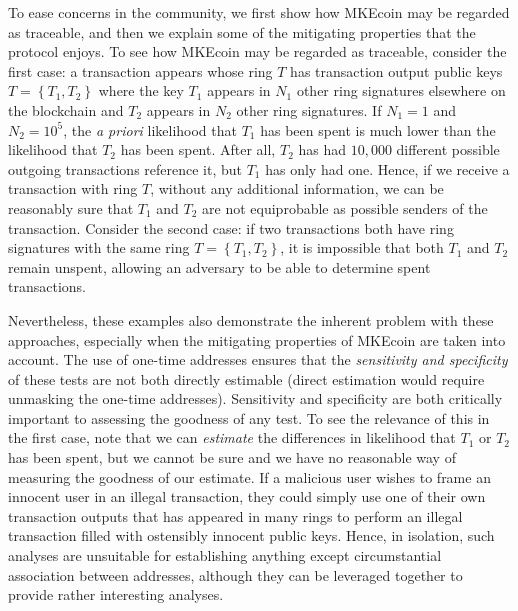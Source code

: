 \documentclass[12pt,english]{mrl}
\theoremstyle{definition}
\numberwithin{equation}{section}
\numberwithin{figure}{section}
\numberwithin{equation}{section}
\numberwithin{equation}{section}
\numberwithin{figure}{section}
\begin{document}
To ease concerns in the community, we first show how MKEcoin may be regarded as traceable, and then we explain some of the mitigating properties that the protocol enjoys. To see how MKEcoin may be regarded as traceable, consider the first case: a transaction appears whose ring $T$ has transaction output public keys $T = \left\{T_1, T_2\right\}$ where the key $T_1$ appears in $N_1$ other ring signatures elsewhere on the blockchain and $T_2$ appears in $N_2$ other ring signatures. If $N_1 = 1$ and $N_2 = 10^5$, the \textit{a priori} likelihood that $T_1$ has been spent is much lower than the likelihood that $T_2$ has been spent. After all, $T_2$ has had $10,000$ different possible outgoing transactions reference it, but $T_1$ has only had one. Hence, if we receive a transaction with ring $T$, without any additional information, we can be reasonably sure that $T_1$ and $T_2$ are not equiprobable as possible senders of the transaction. Consider the second case: if two transactions both have ring signatures with the same ring $T  = \left\{T_1, T_2\right\}$, it is impossible that both $T_1$ and $T_2$ remain unspent, allowing an adversary to be able to determine spent transactions.

Nevertheless, these examples also demonstrate the inherent problem with these approaches, especially when the mitigating properties of MKEcoin are taken into account. The use of one-time addresses ensures that the \textit{sensitivity and specificity} of these tests are not both directly estimable (direct estimation would require unmasking the one-time addresses). Sensitivity and specificity are both critically important to assessing the goodness of any test.  To see the relevance of this in the first case, note that we can \textit{estimate} the differences in likelihood that $T_1$ or $T_2$ has been spent, but we cannot be sure and we have no reasonable way of measuring the goodness of our estimate. If a malicious user wishes to frame an innocent user in an illegal transaction, they could simply use one of their own transaction outputs that has appeared in many rings to perform an illegal transaction filled with ostensibly innocent public keys. Hence, in isolation, such analyses are unsuitable for establishing anything except circumstantial association between addresses, although they can be leveraged together to provide rather interesting analyses. 
\end{document}
